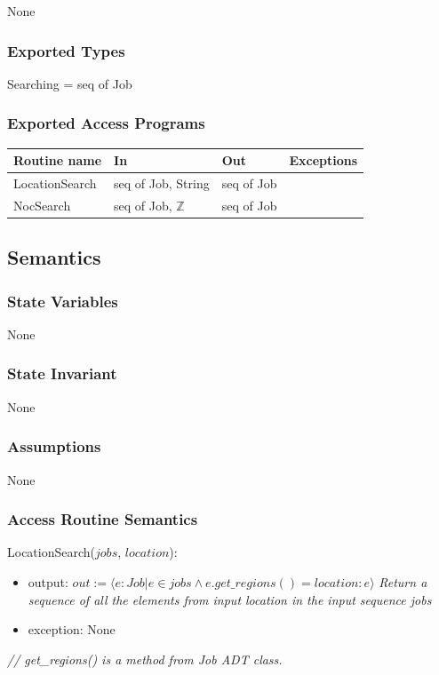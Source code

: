 \documentclass[12pt]{article}
\begin{document}
None
\subsubsection* {Exported Types}

Searching = seq of Job

\subsubsection* {Exported Access Programs}

\begin{tabular}{| l | l | l | l |}
\hline
\textbf{Routine name} & \textbf{In} & \textbf{Out} & \textbf{Exceptions}\\
\hline
LocationSearch & seq of Job, String & seq of Job & \\
\hline
NocSearch & seq of Job, $\mathbb{Z}$ & seq of Job & \\
\hline
\end{tabular}

\subsection* {Semantics}

\subsubsection* {State Variables}

None

\subsubsection* {State Invariant}

None
\subsubsection* {Assumptions}

None

\subsubsection* {Access Routine Semantics}

\noindent LocationSearch($jobs$, $location$):
\begin{itemize}
\item output: $out := \langle e: Job | e \in jobs \wedge e.get\_regions() = location : e \rangle $ \textit{Return a sequence of all the elements from input location in the input sequence jobs}
\item exception: None
\end{itemize}
\noindent \textit{// get\_regions() is a method from Job ADT class.}\\
\end{document}
